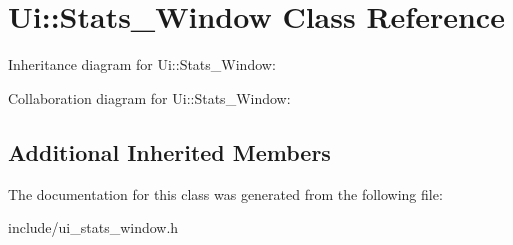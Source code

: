 \hypertarget{class_ui_1_1_stats___window}{}\section{Ui\+:\+:Stats\+\_\+\+Window Class Reference}
\label{class_ui_1_1_stats___window}


Inheritance diagram for Ui\+:\+:Stats\+\_\+\+Window\+:


Collaboration diagram for Ui\+:\+:Stats\+\_\+\+Window\+:
\subsection*{Additional Inherited Members}


The documentation for this class was generated from the following file\+:\begin{DoxyCompactItemize}
\item 
include/ui\+\_\+stats\+\_\+window.\+h\end{DoxyCompactItemize}
